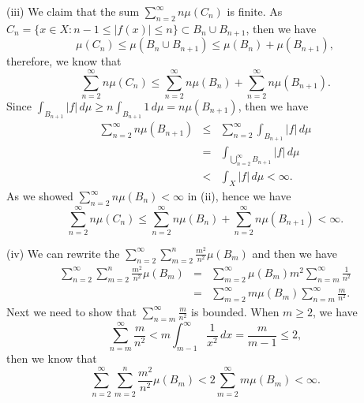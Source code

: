\documentclass[12pt,a4paper]{ctexart}
\begin{document}
(iii) We claim that the sum $\sum_{n=2}^{\infty} n \mu(C_{n})$ is finite. As $C_{n} = \{x \in X : n-1 \leq |f(x)| \leq n \} \subset B_{n} \cup B_{n+1}$, then we have
\begin{equation*}
    \mu(C_{n}) \leq \mu(B_{n} \cup B_{n+1}) \leq \mu(B_{n}) + \mu(B_{n+1}),
\end{equation*}
therefore, we know that
\begin{equation*}
    \sum_{n=2}^{\infty} n \mu(C_{n}) \leq \sum_{n=2}^{\infty} n \mu(B_{n}) +  \sum_{n=2}^{\infty} n \mu (B_{n+1}).
\end{equation*}
Since $\int_{B_{n+1}}^{} |f| \, d \mu  \geq n \int_{B_{n+1}}^{} 1 \, d \mu = n \mu(B_{n+1})$, then we have
\begin{eqnarray*}
    \sum_{n=2}^{\infty} n \mu(B_{n+1}) & \leq & \sum_{n=2}^{\infty} \int_{B_{n+1}}^{} |f| \, d \mu \\
    & = & \int_{\bigcup_{n=2}^{\infty} B_{n+1}}^{} |f| \, d \mu \\
    & < & \int_{X}^{} |f| \, d \mu < \infty.
\end{eqnarray*}
As we showed $\sum_{n=2}^{\infty} n \mu(B_{n}) < \infty$ in (ii), hence we have
\begin{equation*}
    \sum_{n=2}^{\infty} n \mu(C_{n}) \leq \sum_{n=2}^{\infty} n \mu(B_{n}) +  \sum_{n=2}^{\infty} n \mu (B_{n+1}) < \infty.
\end{equation*}

(iv) We can rewrite the $\sum_{n=2}^{\infty} \sum_{m=2}^{n} \frac{m^{2}}{n^{2}} \mu(B_{m}) $ and then we have
\begin{eqnarray*}
    \sum_{n=2}^{\infty} \sum_{m=2}^{n} \frac{m^{2}}{n^{2}} \mu(B_{m}) & = & \sum_{m=2}^{\infty} \mu(B_{m}) m^{2} \sum_{n=m}^{\infty} \frac{1}{n^{2}}  \\
    & = & \sum_{m=2}^{\infty} m \mu(B_{m}) \sum_{n=m}^{\infty} \frac{m}{n^{2}}.
\end{eqnarray*}
Next we need to show that $\sum_{n=m}^{\infty} \frac{m}{n^{2}}$ is bounded. When $m \geq 2$, we have
\begin{equation*}
    \sum_{n=m}^{\infty} \frac{m}{n^{2}} < m \int_{m-1}^{\infty} \frac{1}{x^{2}} \, d x = \frac{m}{m-1} \leq 2,
\end{equation*}
then we know that
\begin{equation*}
    \sum_{n=2}^{\infty} \sum_{m=2}^{n} \frac{m^{2}}{n^{2}} \mu(B_{m}) < 2 \sum_{m=2}^{\infty} m \mu(B_{m}) < \infty.
\end{equation*}
\end{document}
